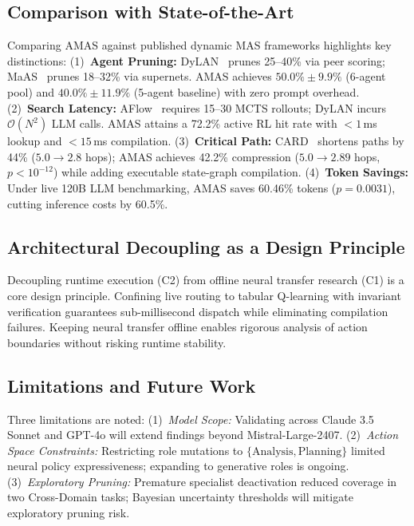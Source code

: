 \documentclass[conference]{IEEEtran}
\begin{document}
\subsection{Comparison with State-of-the-Art}
Comparing AMAS against published dynamic MAS frameworks highlights key distinctions:
(1)~\textbf{Agent Pruning:} DyLAN~\cite{liu2024dylan} prunes 25--40\% via peer scoring; MaAS~\cite{Zhang2025MaAS} prunes 18--32\% via supernets. AMAS achieves $\mathbf{50.0\% \pm 9.9\%}$ (6-agent pool) and $\mathbf{40.0\% \pm 11.9\%}$ (5-agent baseline) with zero prompt overhead.
(2)~\textbf{Search Latency:} AFlow~\cite{zhang2024aflow} requires 15--30 MCTS rollouts; DyLAN incurs $\mathcal{O}(N^2)$ LLM calls. AMAS attains a 72.2\% active RL hit rate with $<1$\,ms lookup and $<15$\,ms compilation.
(3)~\textbf{Critical Path:} CARD~\cite{Li2025AdaptiveGraphPruning} shortens paths by 44\% ($5.0 \to 2.8$ hops); AMAS achieves 42.2\% compression ($5.0 \to 2.89$ hops, $p < 10^{-12}$) while adding executable state-graph compilation.
(4)~\textbf{Token Savings:} Under live 120B LLM benchmarking, AMAS saves 60.46\% tokens ($p = 0.0031$), cutting inference costs by 60.5\%.

\subsection{Architectural Decoupling as a Design Principle}
Decoupling runtime execution (C2) from offline neural transfer research (C1) is a core design principle. Confining live routing to tabular Q-learning with invariant verification guarantees sub-millisecond dispatch while eliminating compilation failures. Keeping neural transfer offline enables rigorous analysis of action boundaries without risking runtime stability.

\subsection{Limitations and Future Work}
Three limitations are noted: (1)~\textit{Model Scope:} Validating across Claude 3.5 Sonnet and GPT-4o will extend findings beyond Mistral-Large-2407. (2)~\textit{Action Space Constraints:} Restricting role mutations to $\{\text{Analysis}, \text{Planning}\}$ limited neural policy expressiveness; expanding to generative roles is ongoing. (3)~\textit{Exploratory Pruning:} Premature specialist deactivation reduced coverage in two Cross-Domain tasks; Bayesian uncertainty thresholds will mitigate exploratory pruning risk.

\end{document}
